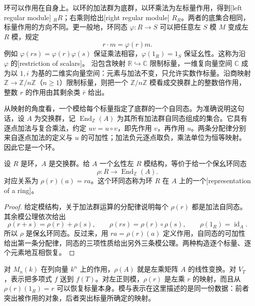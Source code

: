 环可以作用在自身上。以环的加法群为底群，以环乘法为左标量作用，得到[left regular module] \({}_RR\)；右乘则给出[right regular module] \(R_R\)。两者的底集合相同，标量作用的方向不同。更一般地，环同态 \(\varphi:R\to S\) 可以把任意左 \(S\) 模 \(M\) 变成左 \(R\) 模，规定
\[
	r\cdot m=\varphi(r)m.
\]
例如 \(\varphi(rs)=\varphi(r)\varphi(s)\) 保证乘法相容，\(\varphi(1_R)=1_S\) 保证幺性。这称为沿 \(\varphi\) 的[restriction of scalars]。 沿包含映射 \(\mathbb R\hookrightarrow\mathbb C\) 限制标量，一维复向量空间 \(\mathbb C\) 成为以 \(1,i\) 为基的二维实向量空间：元素与加法不变，只允许实数作标量。沿商映射 \(\mathbb Z\to\mathbb Z/n\mathbb Z\)（\(n\ge1\)）限制标量，则把一个 \(\mathbb Z/n\mathbb Z\) 模看成交换群上的整数倍作用，整数 \(r\) 的作用由其剩余类 \(\bar r\) 给出。

\ProseParagraphBreak
从映射的角度看，一个模给每个标量指定了底群的一个自同态。为准确说明这句话，设 \(A\) 为交换群，记 \(\operatorname{End}_{\mathbb Z}(A)\) 为其所有加法群自同态组成的集合。它具有逐点加法与复合乘法，约定 \(uv=u\circ v\)，即先作用 \(v\)，再作用 \(u\)。两条分配律分别来自逐点加法的定义与 \(u\) 的可加性；加法负元逐点取负，乘法单位为恒等映射。因此它是一个环。

\begin{proposition}\label{b2:prop:module-representation}
	设 \(R\) 是环，\(A\) 是交换群。给 \(A\) 一个幺性左 \(R\) 模结构，等价于给一个保幺环同态
	\[
		\rho:R\longrightarrow\operatorname{End}_{\mathbb Z}(A).
	\]
	对应关系为 \(\rho(r)(a)=ra\)。这个环同态称为环 \(R\) 在 \(A\) 上的一个[representation of a ring]。
\end{proposition}
\begin{proof}
	给定模结构，关于加法群运算的分配律说明每个 \(\rho(r)\) 都是加法自同态。其余模公理依次给出
	\[
		\rho(r+s)=\rho(r)+\rho(s),\qquad \rho(rs)=\rho(r)\circ\rho(s),\qquad \rho(1_R)=\operatorname{id}_A.
	\]
	所以 \(\rho\) 是保幺环同态。反过来，用 \(ra=\rho(r)(a)\) 定义作用，自同态的可加性给出第一条分配律，同态的三项性质给出另外三条模公理。两种构造逐个标量、逐个元素地互相恢复。
\end{proof}

对 \(M_n(k)\) 在列向量 \(k^n\) 上的作用，\(\rho(A)\) 就是左乘矩阵 \(A\) 的线性变换。对 \(V_T\)，表示把多项式 \(f\) 送到 \(f(T)\)。对左正则模，\(\rho(r)\) 是左乘 \(r\) 的映射，而且从 \(\rho(r)(1_R)=r\) 可以恢复标量本身。模与表示在这里描述的是同一份数据：前者突出被作用的对象，后者突出标量所确定的映射。
